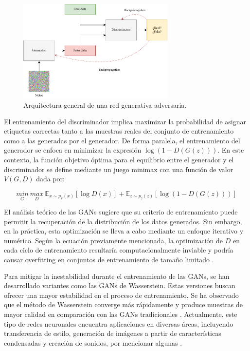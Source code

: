 \begin{figure}[H]
    \begin{center}
        \includegraphics[width=0.7\textwidth]{Images/gan.pdf}
    \end{center}
    \caption{Arquitectura general de una red generativa adversaria.}
    \label{fig:GANs}
\end{figure}

El entrenamiento del discriminador implica maximizar la probabilidad de asignar etiquetas correctas tanto a las muestras reales del conjunto de entrenamiento como a las generadas por el generador. De forma paralela, el entrenamiento del generador se enfoca en minimizar la expresión \(\log(1 - D(G(z)))\). En este contexto, la función objetivo óptima para el equilibrio entre el generador y el discriminador se define mediante un juego minimax con una función de valor \(V(G, D)\) dada por:

\begin{equation}
    \underset{G}{min}\:\underset{D}{max}\: \mathbb{E}_{x \sim p_{x}(x)}[\log D(x)] + \mathbb{E}_{z \sim p_{z}(z)} [\log (1-D(G(z)))]
\end{equation}

El análisis teórico de las GANs sugiere que su criterio de entrenamiento puede permitir la recuperación de la distribución de los datos generados. Sin embargo, en la práctica, esta optimización se lleva a cabo mediante un enfoque iterativo y numérico. Según la ecuación previamente mencionada, la optimización de \(D\) en cada ciclo de entrenamiento resultaría computacionalmente inviable y podría causar overfitting en conjuntos de entrenamiento de tamaño limitado \cite{jiang2018deep}.

Para mitigar la inestabilidad durante el entrenamiento de las GANs, se han desarrollado variantes como las GANs de Wasserstein. Estas versiones buscan ofrecer una mayor estabilidad en el proceso de entrenamiento. Se ha observado que el método de Wasserstein converge más rápidamente y produce muestras de mayor calidad en comparación con las GANs tradicionales \cite{arjovsky2017wasserstein}. Actualmente, este tipo de redes neuronales encuentra aplicaciones en diversas áreas, incluyendo transferencia de estilo, generación de imágenes a partir de características condensadas y creación de sonidos, por mencionar algunas \cite{goodfellow2016deep}.
